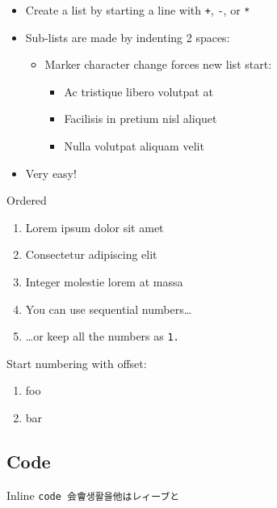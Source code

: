 \documentclass[
  paper=a4,
  ,captions=tableheading
]{scrartcl}
\providecommand{\tightlist}{%
  \setlength{\itemsep}{0pt}\setlength{\parskip}{0pt}}
\begin{document}
\begin{itemize}
\tightlist
\item
  Create a list by starting a line with
  \colorbox{inlinecode-bgcolor}{\lstinline{+}},
  \colorbox{inlinecode-bgcolor}{\lstinline{-}}, or
  \colorbox{inlinecode-bgcolor}{\lstinline{*}}
\item
  Sub-lists are made by indenting 2 spaces:

  \begin{itemize}
  \tightlist
  \item
    Marker character change forces new list start:

    \begin{itemize}
    \tightlist
    \item
      Ac tristique libero volutpat at
    \item
      Facilisis in pretium nisl aliquet
    \item
      Nulla volutpat aliquam velit
    \end{itemize}
  \end{itemize}
\item
  Very easy!
\end{itemize}

Ordered

\begin{enumerate}
\def\labelenumi{\arabic{enumi}.}
\item
  Lorem ipsum dolor sit amet
\item
  Consectetur adipiscing elit
\item
  Integer molestie lorem at massa
\item
  You can use sequential numbers\ldots{}
\item
  \ldots or keep all the numbers as
  \colorbox{inlinecode-bgcolor}{\lstinline{1.}}
\end{enumerate}

Start numbering with offset:

\begin{enumerate}
\def\labelenumi{\arabic{enumi}.}
\setcounter{enumi}{56}
\tightlist
\item
  foo
\item
  bar
\end{enumerate}

\hypertarget{code}{%
\subsection{Code}\label{code}}

Inline
\colorbox{inlinecode-bgcolor}{\lstinline{code 会會생활을他はレィーブと}}
\end{document}
